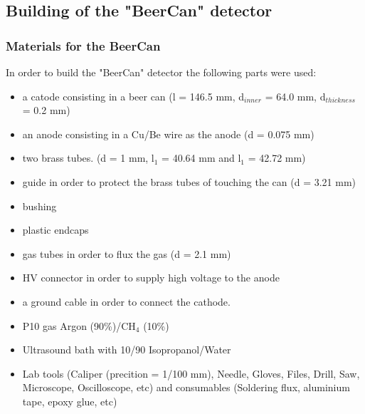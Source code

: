 \subsection{Building of the "BeerCan" detector}
\label{sec:building_beercan}

\subsubsection{Materials for the BeerCan}
\label{sec:materials_beercan}
In order to build the "BeerCan" detector the following parts were used:
\begin{itemize}
\item a catode consisting in a beer can (l = 146.5 mm, d$_{inner}$ = 64.0 mm,
  d$_{thickness}$ = 0.2 mm)
\item an anode consisting in a Cu/Be wire as the anode (d = 0.075 mm)
\item two brass tubes. (d = 1 mm, l$_{1}$ = 40.64 mm and l$_{1}$ = 42.72 mm)
\item guide in order to protect the brass tubes of touching the can (d = 3.21
  mm)
\item bushing
\item plastic endcaps
\item gas tubes in order to flux the gas (d = 2.1 mm)
\item HV connector in order to supply high voltage to the anode
\item a ground cable in order to connect the cathode.
\item P10 gas Argon (90\%)/CH$_{4}$ (10\%)
\item Ultrasound bath with 10/90 Isopropanol/Water
\item Lab tools (Caliper (precition = 1/100 mm), Needle, Gloves, Files, Drill,
  Saw, Microscope, Oscilloscope, etc) and consumables (Soldering flux, aluminium
  tape, epoxy glue, etc)
\end{itemize}

